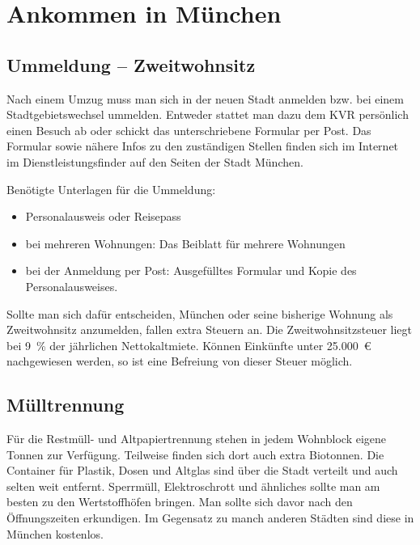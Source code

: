 ﻿\chapter{Ankommen in München}

\section{Ummeldung -- Zweitwohnsitz}

Nach einem Umzug muss man sich in der neuen Stadt anmelden bzw. bei einem Stadtgebietswechsel ummelden. Entweder stattet man dazu dem KVR persönlich einen Besuch ab oder schickt das unterschriebene Formular per Post. Das Formular sowie nähere Infos zu den zuständigen Stellen finden sich im Internet im Dienstleistungsfinder auf den Seiten der Stadt München.

Benötigte Unterlagen für die Ummeldung: %
\begin{itemize}
	\item Personalausweis oder Reisepass
	\item bei mehreren Wohnungen: Das Beiblatt für mehrere Wohnungen
	\item bei der Anmeldung per Post: Ausgefülltes Formular und Kopie des Personalausweises.
\end{itemize}

Sollte man sich dafür entscheiden, München oder seine bisherige Wohnung als Zweitwohnsitz anzumelden, fallen extra Steuern an. Die Zweitwohnsitzsteuer liegt bei 9~\% der jährlichen Nettokaltmiete. Können Einkünfte unter 25.000~€ nachgewiesen werden, so ist eine Befreiung von dieser Steuer möglich.

\begin{urlList}
\end{urlList}

\section{Mülltrennung}

Für die Restmüll- und Altpapiertrennung stehen in jedem Wohnblock eigene Tonnen zur Verfügung. Teilweise finden sich dort auch extra Biotonnen.
Die Container für Plastik, Dosen und Altglas sind über die Stadt verteilt und auch selten weit entfernt.
Sperrmüll, Elektroschrott und ähnliches sollte man am besten zu den Wertstoffhöfen bringen. Man sollte sich davor nach den Öffnungszeiten erkundigen. Im Gegensatz zu manch anderen Städten sind diese in München kostenlos.

